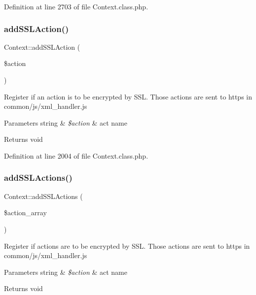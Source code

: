 Definition at line 2703 of file Context.\+class.\+php.

\mbox{\label{classContext_a781f5e7a057e6f0992310318a0339ae8}} 
\subsubsection{\texorpdfstring{add\+S\+S\+L\+Action()}{addSSLAction()}}
{\footnotesize\ttfamily Context\+::add\+S\+S\+L\+Action (\begin{DoxyParamCaption}\item[{}]{\$action }\end{DoxyParamCaption})}

Register if an action is to be encrypted by S\+SL. Those actions are sent to https in common/js/xml\+\_\+handler.\+js


\begin{DoxyParams}[1]{Parameters}
string & {\em \$action} & act name \\
\hline
\end{DoxyParams}
\begin{DoxyReturn}{Returns}
void 
\end{DoxyReturn}


Definition at line 2004 of file Context.\+class.\+php.

\mbox{\label{classContext_ab2acd5415515b232b7cf9f0130f4efa3}} 
\subsubsection{\texorpdfstring{add\+S\+S\+L\+Actions()}{addSSLActions()}}
{\footnotesize\ttfamily Context\+::add\+S\+S\+L\+Actions (\begin{DoxyParamCaption}\item[{}]{\$action\+\_\+array }\end{DoxyParamCaption})}

Register if actions are to be encrypted by S\+SL. Those actions are sent to https in common/js/xml\+\_\+handler.\+js


\begin{DoxyParams}[1]{Parameters}
string & {\em \$action} & act name \\
\hline
\end{DoxyParams}
\begin{DoxyReturn}{Returns}
void 
\end{DoxyReturn}


